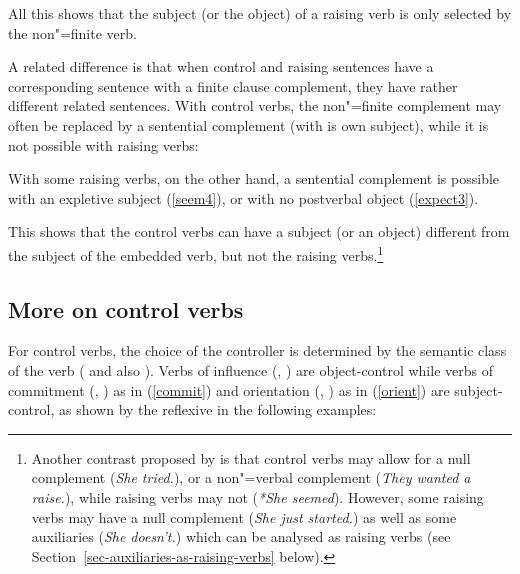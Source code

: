 \noindent
All this shows that the subject (or the object) of a raising verb is only selected by the
non"=finite verb.

A related difference is that when control and raising sentences have a corresponding sentence with a finite clause complement, they have rather different related sentences.
With control verbs, the non"=finite complement may often be replaced by a sentential complement (with is own subject), while it is not possible with raising verbs:

\eal
{}
\zl

\eal
{}
\zl

With some raising verbs, on the other hand, a sentential complement is possible with an expletive
subject (\ref{seem4}), or with no postverbal object (\ref{expect3}). 

\eal
{}
\zl

\noindent
This shows that the control verbs can have a subject (or an object) different from the subject of
the embedded verb, but not the raising verbs.\footnote{%
  Another contrast proposed by
  \citet{Jacobson1990}\iaddpages is that control verbs may allow for a null complement (\emph{She tried.}), or
  a non"=verbal complement (\emph{They wanted a raise.}), while raising verbs may not (\emph{*She
    seemed}). However, some raising verbs may have a null complement (\emph{She just started.}) as
  well as some auxiliaries (\emph{She doesn't.}) which can be analysed as raising verbs (see
  Section~\ref{sec-auxiliaries-as-raising-verbs} below).%
} 

\subsection{More on control verbs}

For control verbs, the choice of the controller is determined by the semantic class of the verb
(\citealt[Chapter~3]{PollardandSag1992} and also \citealt{JackendoffandCulicover2003}).  Verbs of
influence (, ) are object-control while verbs of commitment
(, ) as in (\ref{commit}) and orientation (, ) as in
(\ref{orient}) are subject-control, as shown by the reflexive in the following examples: 

